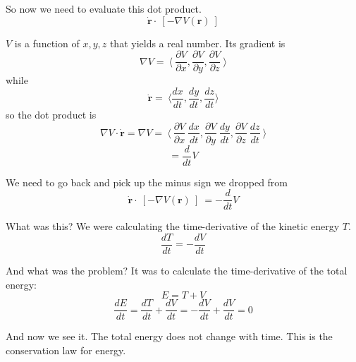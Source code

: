 \documentclass[11pt, oneside]{article}
\begin{document}
So now we need to evaluate this dot product.
\[ \mathbf{\dot{r}} \cdot \ [ - \nabla V(\mathbf{r}) \  ] \]

$V$ is a function of $x,y,z$ that yields a real number.  Its gradient is
\[ \nabla V = \ \langle \ \frac{\partial V}{\partial x},  \frac{\partial V}{\partial y},  \frac{\partial V}{\partial z} \ \rangle \]
while 
\[ \mathbf{\dot{r}} = \ \langle \frac{dx}{dt}, \frac{dy}{dt}, \frac{dz}{dt} \rangle \]
so the dot product is
\[  \nabla V \cdot  \mathbf{\dot{r}}  = \nabla V = \ \langle \ \frac{\partial V}{\partial x} \ \frac{dx}{dt},  \frac{\partial V}{\partial y} \ \frac{dy}{dt},  \frac{\partial V}{\partial z} \ \frac{dz}{dt} \ \rangle \]
\[ = \frac{d}{dt} V \]

We need to go back and pick up the minus sign we dropped from
\[ \mathbf{\dot{r}} \cdot \ [ - \nabla V(\mathbf{r}) \  ]  \ = - \frac{d}{dt} V \]

What was this?  We were calculating the time-derivative of the kinetic energy $T$.
\[ \frac{dT}{dt} = - \frac{dV}{dt} \]

And what was the problem?  It was to calculate the time-derivative of the total energy:
\[ E = T + V \]
\[ \frac{dE}{dt} =  \frac{dT}{dt} +  \frac{dV}{dt} =  -\frac{dV}{dt} +  \frac{dV}{dt} = 0 \]

And now we see it.  The total energy does not change with time.  This is the conservation law for energy.
\end{document}
